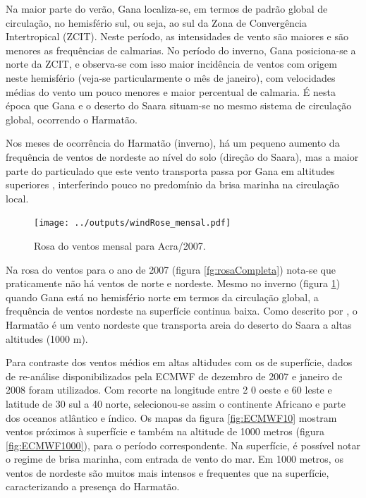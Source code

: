 Na maior parte do verão, Gana localiza-se, em termos de padrão global de 
circulação, no hemisfério sul, ou seja, ao sul da Zona de Convergência 
Intertropical (ZCIT). Neste período, as intensidades de vento são maiores e 
são menores as frequências de calmarias. No período do inverno, Gana 
posiciona-se a norte da ZCIT, e observa-se com isso maior incidência de 
ventos com origem neste hemisfério (veja-se particularmente o mês 
de janeiro), 
com velocidades médias do vento um pouco menores e maior percentual
de calmaria. É nesta época que Gana e o deserto do Saara situam-se no mesmo 
sistema de circulação global, ocorrendo o Harmatão. 

Nos meses de ocorrência do Harmatão (inverno), há um pequeno aumento da 
frequência de ventos de nordeste ao nível do solo (direção do Saara), mas a 
maior parte do particulado que este vento transporta passa por Gana em 
altitudes superiores \citep{breuning2005}, interferindo pouco no predomínio 
da brisa marinha na circulação local.%

\begin{figure}[H]
  \centering
  \texttt{[image: ../outputs/windRose\_mensal.pdf]}
  \caption{Rosa do ventos mensal para Acra/2007. \label{fig:windRose_mensal}}
\end{figure}

\newpage

Na rosa do ventos para o ano de 2007 (figura \ref{fg:rosaCompleta}) nota-se 
que praticamente não há ventos de norte e nordeste. Mesmo no inverno 
(figura \ref{fig:windRose_mensal}) quando Gana está no hemisfério norte em 
termos da circulação global, a frequência de ventos nordeste na superfície 
continua baixa. 
Como descrito por \citet{breuning2005}, o Harmatão é um vento nordeste 
que transporta areia do deserto do Saara a altas altitudes (1000 m).

Para contraste dos ventos médios em altas altidudes com os de superfície, 
dados de re-análise disponibilizados pela ECMWF de dezembro de 
2007 e janeiro de 2008 foram utilizados. Com recorte na longitude entre 2
0 oeste e 60 leste e latitude de 30 sul a 40 norte, selecionou-se assim o 
continente Africano e parte dos oceanos atlântico e índico. 
Os mapas da figura \ref{fig:ECMWF10} mostram
ventos próximos à superfície e também na altitude 
de 1000 metros (figura \ref{fig:ECMWF1000}), para o  período correspondente. 
Na superfície, é possível notar o regime de brisa marinha, com entrada de vento 
do mar. Em 1000 metros, os ventos de nordeste são muitos mais intensos e 
frequentes que na superfície, caracterizando a presença do Harmatão. 

